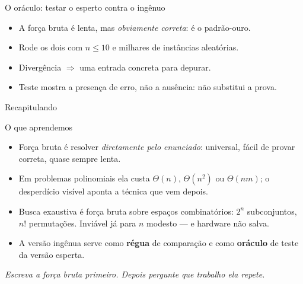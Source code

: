 \documentclass[aspectratio=169]{beamer}
\begin{document}
\begin{frame}{O oráculo: testar o esperto contra o ingênuo}
  \begin{center}
  \end{center}
  \vspace{-4pt}
  \begin{itemize}
    \item A força bruta é lenta, mas \emph{obviamente correta}: é o padrão-ouro.
    \item Rode os dois com $n \le 10$ e milhares de instâncias aleatórias.
    \item Divergência $\Rightarrow$ uma entrada concreta para depurar.
    \item Teste mostra a presença de erro, não a ausência: não substitui a prova.
  \end{itemize}
\end{frame}

\begin{frame}{Recapitulando}
  \begin{block}{O que aprendemos}
    \begin{itemize}
      \item Força bruta é resolver \emph{diretamente pelo enunciado}: universal,
        fácil de provar correta, quase sempre lenta.
      \item Em problemas polinomiais ela custa $\Theta(n)$, $\Theta(n^2)$ ou
        $\Theta(nm)$; o desperdício visível aponta a técnica que vem depois.
      \item Busca exaustiva é força bruta sobre espaços combinatórios:
        $2^n$ subconjuntos, $n!$ permutações. Inviável já para $n$ modesto ---
        e hardware não salva.
      \item A versão ingênua serve como \textbf{régua} de comparação e como
        \textbf{oráculo} de teste da versão esperta.
    \end{itemize}
  \end{block}
  \begin{center}
    \small\itshape Escreva a força bruta primeiro. Depois pergunte que trabalho ela repete.
  \end{center}
\end{frame}
\end{document}
